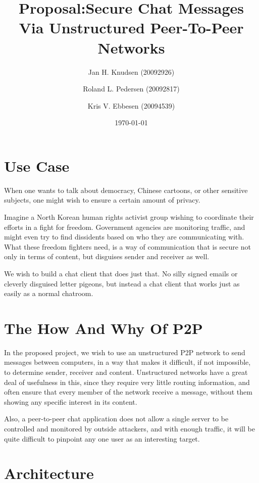 \documentclass{article}
\begin{document}
\thispagestyle{empty}

\title{Proposal:Secure Chat Messages Via Unstructured Peer-To-Peer Networks}
\date{\today}
\author{Jan H. Knudsen (20092926)
\and
Roland L. Pedersen (20092817)
\and
Kris V. Ebbesen (20094539)
}
\maketitle

\section{Use Case}

When one wants to talk about democracy, Chinese cartoons, or other sensitive subjects, one might wish to ensure a certain amount of privacy.

Imagine a North Korean human rights activist group wishing to coordinate their efforts in a fight for freedom. Government agencies are monitoring traffic, and might even try to find dissidents based on who they are communicating with. What these freedom fighters need, is a way of communication that is secure not only in terms of content, but disguises sender and receiver as well.

We wish to build a chat client that does just that. No silly signed emails or cleverly disguised letter pigeons, but instead a chat client that works just as easily as a normal chatroom.

\section{The How And Why Of P2P}

In the proposed project, we wish to use an unstructured P2P network to send messages between computers, in a way that makes it difficult, if not impossible, to determine sender, receiver and content. Unstructured networks have a great deal of usefulness in this, since they require very little routing information, and often ensure that every member of the network receive a message, without them showing any specific interest in its content.

Also, a peer-to-peer chat application does not allow a single server to be controlled and monitored by outside attackers, and with enough traffic, it will be quite difficult to pinpoint any one user as an interesting target.

\section{Architecture}
\end{document}
